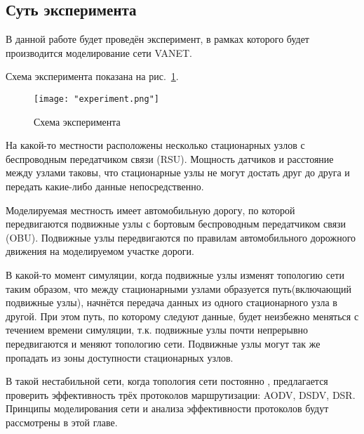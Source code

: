 \subsection*{Суть эксперимента}

В данной работе будет проведён эксперимент, в рамках которого будет производится моделирование сети VANET. 

Схема эксперимента показана на рис.~\ref{fig:experiment_scheme}.

\begin{figure}[!h]
    \centering
    \texttt{[image: "experiment.png"]}
    \caption{Схема эксперимента}
    \label{fig:experiment_scheme}
\end{figure}

На какой-то местности расположены несколько стационарных узлов с беспроводным передатчиком связи (RSU). Мощность датчиков и расстояние между узлами таковы, что стационарные узлы не могут достать друг до друга и передать какие-либо данные непосредственно. 

Моделируемая местность имеет автомобильную дорогу, по которой передвигаются подвижные узлы с бортовым беспроводным передатчиком связи (OBU). Подвижные узлы передвигаются по правилам автомобильного дорожного движения на моделируемом участке дороги.

В какой-то момент симуляции, когда подвижные узлы изменят топологию сети таким образом, что между стационарными узлами образуется путь(включающий подвижные узлы), начнётся передача данных из одного стационарного узла в другой. При этом путь, по которому следуют данные, будет неизбежно меняться с течением времени симуляции, т.к. подвижные узлы почти непрерывно передвигаются и меняют топологию сети. Подвижные узлы могут так же пропадать из зоны доступности стационарных узлов.

В такой нестабильной сети, когда топология сети постоянно , предлагается проверить эффективность трёх протоколов маршрутизации: AODV, DSDV, DSR. Принципы моделирования сети и анализа эффективности протоколов будут рассмотрены в этой главе.